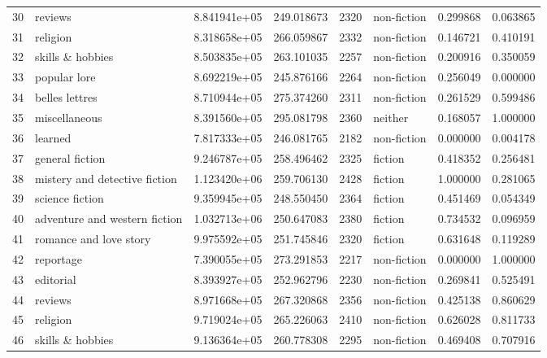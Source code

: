 \documentclass[11pt]{article}
\begin{document}
\begin{longtable}{llrrrlrr}
30 &                        reviews &  8.841941e+05 &  249.018673 &  2320 &   non-fiction &    0.299868 &     0.063865 \\
31 &                       religion &  8.318658e+05 &  266.059867 &  2332 &   non-fiction &    0.146721 &     0.410191 \\
32 &               skills \& hobbies &  8.503835e+05 &  263.101035 &  2257 &   non-fiction &    0.200916 &     0.350059 \\
33 &                   popular lore &  8.692219e+05 &  245.876166 &  2264 &   non-fiction &    0.256049 &     0.000000 \\
34 &                 belles lettres &  8.710944e+05 &  275.374260 &  2311 &   non-fiction &    0.261529 &     0.599486 \\
35 &                  miscellaneous &  8.391560e+05 &  295.081798 &  2360 &       neither &    0.168057 &     1.000000 \\
36 &                        learned &  7.817333e+05 &  246.081765 &  2182 &   non-fiction &    0.000000 &     0.004178 \\
37 &                general fiction &  9.246787e+05 &  258.496462 &  2325 &       fiction &    0.418352 &     0.256481 \\
38 &  mistery and detective fiction &  1.123420e+06 &  259.706130 &  2428 &       fiction &    1.000000 &     0.281065 \\
39 &                science fiction &  9.359945e+05 &  248.550450 &  2364 &       fiction &    0.451469 &     0.054349 \\
40 &  adventure and western fiction &  1.032713e+06 &  250.647083 &  2380 &       fiction &    0.734532 &     0.096959 \\
41 &         romance and love story &  9.975592e+05 &  251.745846 &  2320 &       fiction &    0.631648 &     0.119289 \\
42 &                      reportage &  7.390055e+05 &  273.291853 &  2217 &   non-fiction &    0.000000 &     1.000000 \\
43 &                      editorial &  8.393927e+05 &  252.962796 &  2230 &   non-fiction &    0.269841 &     0.525491 \\
44 &                        reviews &  8.971668e+05 &  267.320868 &  2356 &   non-fiction &    0.425138 &     0.860629 \\
45 &                       religion &  9.719024e+05 &  265.226063 &  2410 &   non-fiction &    0.626028 &     0.811733 \\
46 &               skills \& hobbies &  9.136364e+05 &  260.778308 &  2295 &   non-fiction &    0.469408 &     0.707916 \\

\end{longtable}
\end{document}
